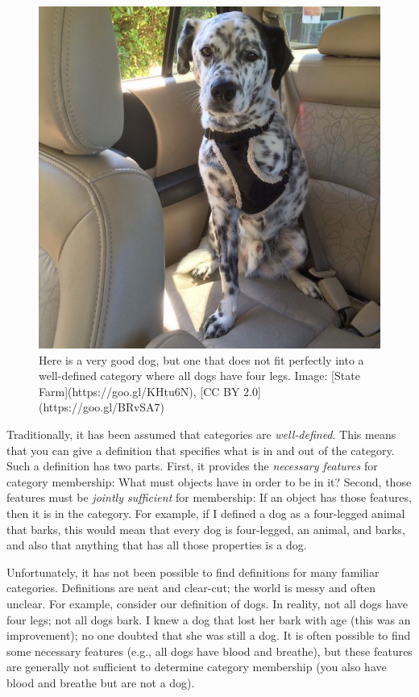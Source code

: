 \documentclass[
]{krantz}
\begin{document}
\begin{figure}

{\centering \includegraphics[width=0.5\linewidth]{images/ch7/dog} 

}

\caption{Here is a very good dog, but one that does not fit perfectly into a well-defined category where all dogs have four legs. Image: [State Farm](https://goo.gl/KHtu6N), [CC BY 2.0](https://goo.gl/BRvSA7)}\label{fig:dog}
\end{figure}

Traditionally, it has been assumed that categories are \emph{well-defined}. This means that you can give a definition that specifies what is in and out of the category. Such a definition has two parts. First, it provides the \emph{necessary features} for category membership: What must objects have in order to be in it? Second, those features must be \emph{jointly sufficient} for membership: If an object has those features, then it is in the category. For example, if I defined a dog as a four-legged animal that barks, this would mean that every dog is four-legged, an animal, and barks, and also that anything that has all those properties is a dog.

Unfortunately, it has not been possible to find definitions for many familiar categories. Definitions are neat and clear-cut; the world is messy and often unclear. For example, consider our definition of dogs. In reality, not all dogs have four legs; not all dogs bark. I knew a dog that lost her bark with age (this was an improvement); no one doubted that she was still a dog. It is often possible to find some necessary features (e.g., all dogs have blood and breathe), but these features are generally not sufficient to determine category membership (you also have blood and breathe but are not a dog).
\end{document}
